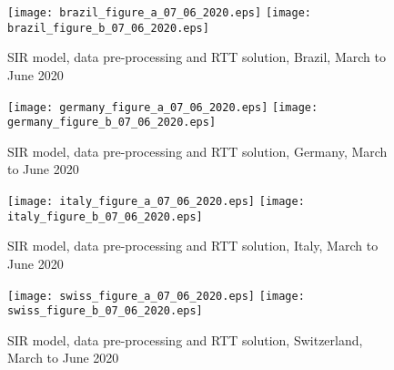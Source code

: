 \documentclass{article}
\begin{document}
{\begin{figure}
\begin{center}
{\texttt{[image: brazil\_figure\_a\_07\_06\_2020.eps]}}
\qquad
{\texttt{[image: brazil\_figure\_b\_07\_06\_2020.eps]}}
\end{center}
\begin{center}
\caption{SIR model, data pre-processing and RTT solution, Brazil, March to June 2020
}
\label{fig:brazil_sir_model_07_06_2020}
\end{center}
\end{figure}

\begin{figure}
\begin{center}
{\texttt{[image: germany\_figure\_a\_07\_06\_2020.eps]}}
\qquad
{\texttt{[image: germany\_figure\_b\_07\_06\_2020.eps]}}
\end{center}
\begin{center}
\caption{SIR model, data pre-processing and RTT solution, Germany, March to June 2020
}
\label{fig:germany_sir_model_07_06_2020}
\end{center}
\end{figure}

\begin{figure}
\begin{center}
{\texttt{[image: italy\_figure\_a\_07\_06\_2020.eps]}}
\qquad
{\texttt{[image: italy\_figure\_b\_07\_06\_2020.eps]}}
\end{center}
\begin{center}
\caption{SIR model, data pre-processing and RTT solution, Italy, March to June 2020
}
\label{fig:italy_sir_model_07_06_2020}
\end{center}
\end{figure}

\begin{figure}
\begin{center}
{\texttt{[image: swiss\_figure\_a\_07\_06\_2020.eps]}}
\qquad
{\texttt{[image: swiss\_figure\_b\_07\_06\_2020.eps]}}
\end{center}
\begin{center}
\caption{SIR model, data pre-processing and RTT solution, Switzerland, March to June 2020
}
\label{fig:swiss_sir_model_07_06_2020}
\end{center}
\end{figure}

}
\end{document}
